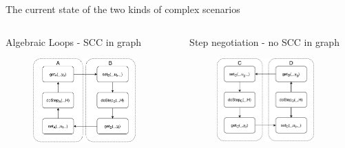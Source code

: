 \documentclass{beamer}
\begin{document}
\begin{frame}{The current state of the two kinds of complex scenarios}
    \begin{columns}[T] 
        \begin{column}{.48\textwidth}
            Algebraic Loops - SCC in graph
            \begin{figure}    
                \includegraphics[width=0.9\textwidth]{images/reactive_step_graph.pdf}
            \end{figure}  
        \end{column}
    \hfill%
    \begin{column}{.48\textwidth}
        Step negotiation - no SCC in graph
        \begin{figure}    
            \centering
            \includegraphics[width=0.9\textwidth]{images/step_scenario_original.pdf}
        \end{figure}
    \end{column}
    \end{columns}
\end{frame}
\end{document}
